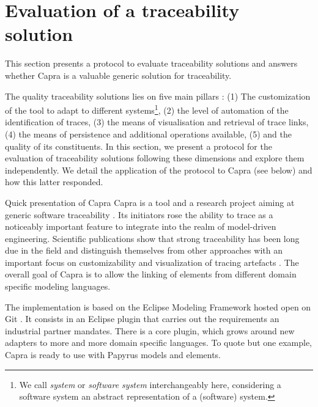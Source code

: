 \section{Evaluation of a traceability solution}\label{sec:evaluation}
This section presents a protocol to evaluate traceability solutions and answers whether Capra is a valuable generic solution for traceability. 
\sideboxend

The quality traceability solutions lies on five main pillars : 
(1) The customization of the tool to adapt to different systems\footnote{We call \textit{system} or \textit{software system} interchangeably here, considering a software system an abstract representation of a (software) system.}, 
(2) the level of automation of the identification of traces, 
(3) the means of visualisation and retrieval of trace links, 
(4) the means of persistence and additional operations available, 
(5) and the quality of its constituents.
In this section, we present a protocol for the evaluation of traceability solutions following these dimensions and explore them independently. We detail the application of the protocol to Capra (see below) and how this latter responded.

\begin{descriptioncompact}
    \item[Quick presentation of Capra] Capra is a tool and a research project aiming at generic software traceability \cite{heisig2019-generic-traceability-metamodel-end-to-end-capra,maro2016_maintenance_factors_and_guidelines}. Its initiators rose the ability to trace as a noticeably important feature to integrate into the realm of model-driven engineering.  Scientific publications show that strong traceability has been long due in the field and distinguish themselves from other approaches with an important focus on customizability and visualization of tracing artefacts \cite{clelandhuang2007bestPracticeForAutomatedTraceability,mader2010-visual-tracability-modeling-language}. The overall goal of Capra is to allow the linking of elements from different domain specific modeling languages.

    The implementation is based on the Eclipse Modeling Framework \cite{EMF} hosted open on Git \cite{Capra_Repo}. It consists in an Eclipse plugin that carries out the requirements an industrial partner mandates. There is a core plugin, which grows around new adapters to more and more domain specific languages. To quote but one example, Capra is ready to use with Papyrus models and elements. 
\end{descriptioncompact}

